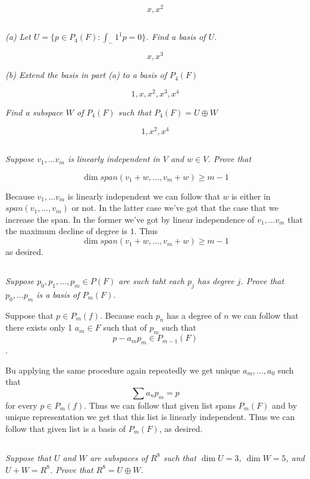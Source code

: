 \documentclass[11pt,oneside,titlepage]{book}
\begin{document}
$$x, x^2$$

\subsection{}
\textit{(a) Let $U = \{p \in P_4(F): \int_-1^1{p} = 0 \}$.
  Find a basis of $U$.}

$$x, x^3$$

\textit{(b) Extend the basis in part (a) to a basis of $P_4(F)$}

$$1, x, x^2, x^3, x^4$$

\textit{Find a subspace $W$ of $P_4(F)$ such that $P_4(F) = U \oplus W$}

$$1, x^2, x^4$$

\subsection{}
\textit{Suppose $v_1, ... v_m$ is linearly independent in $V$ and $w \in V$.
  Prove that}

$$\dim span(v_1 + w, ..., v_m + w) \geq m - 1$$

Because $v_1, ... v_m$ is linearly independent we can follow that $w$ is either
in $span(v_1, ..., v_m)$ or not. In the latter case we've got that the
case that we increase the span. In the former we've got by linear independence
of $v_1, ... v_m$ that the maximum decline of degree is $1$. Thus
$$\dim span(v_1 + w, ..., v_m + w) \geq m - 1$$
as desired.

\subsection{}

\textit{Suppose $p_0, p_1, ..., p_m \in P(F)$ are such taht each $p_j$ has
  degree $j$. Prove that $p_0, ... p_m$ is a basis of $P_m(F)$. }

Suppose that $p \in P_m(f)$. Because each $p_n$ has a degree of $n$ we can
follow that there exists only 1 $a_m \in F$ such that 
of $p_m$ such that
$$p - a_m p_m \in P_{m - 1}(F)$$.

Bu applying the same procedure  again repeatedly  we get unique
$a_m, ..., a_0$ such that
$$\sum{a_n p_m} = p$$
for every $p \in P_m(f)$. Thus we can follow that given list spans $P_m(F)$
and by unique representation we get that this list is linearly independent.
Thus we can follow that given list is a basis of $P_m(F)$, as desired.


\subsection{}
\textit{Suppose that $U$ and $W$ are subspaces of $R^8$ such that $\dim U = 3$,
  $\dim W = 5$, and $U + W = R^8$. Prove that $R^8 = U \oplus W$.}
\end{document}
